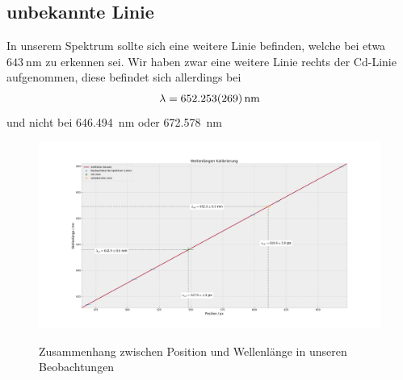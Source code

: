     \subsection{unbekannte Linie}
      In unserem Spektrum sollte sich eine weitere Linie befinden, welche bei etwa $\SI{643}{\nano\metre}$ zu erkennen sei. Wir haben zwar eine weitere Linie rechts der Cd-Linie aufgenommen, diese befindet sich allerdings bei
      \begin{align}
        \lambda = \SI{652.253+-0.269}{nm}
      \end{align}
      und nicht bei \SI{646.494}{nm} oder \SI{672.578}{nm} \cite{nist.gov.cd}



    \begin{landscape}
      \thispagestyle{empty}
      \begin{figure}
        \vspace*{-2cm}
        \caption{Zusammenhang zwischen Position und Wellenlänge in unseren Beobachtungen}
        \hspace*{-6cm}\includegraphics[width=1.5\paperwidth]{Auswertung/wavelength_analysis/wl_ne_cal}
        \label{plt::6}
      \end{figure}
    \end{landscape}
